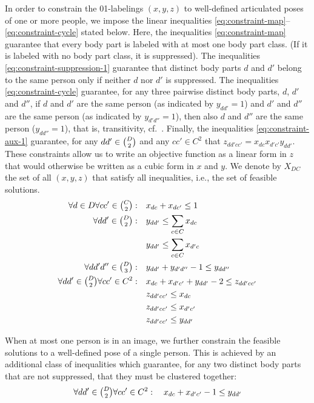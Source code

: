 In order to constrain the 01-labelings $(x,y,z)$ to well-defined articulated poses of one or more people,
we impose the linear inequalities
\eqref{eq:constraint-map}--\eqref{eq:constraint-cycle}
stated below.
%
%
Here, the inequalities
\eqref{eq:constraint-map}
guarantee that every body part is labeled with at most one body part class.
(If it is labeled with no body part class, it is suppressed).
%
The inequalities
\eqref{eq:constraint-suppression-1}
guarantee that distinct body parts $d$ and $d'$ belong to the same person only if neither $d$ nor $d'$ is suppressed.
%
The inequalities
\eqref{eq:constraint-cycle}
guarantee, for any three pairwise distinct body parts, $d$, $d'$ and $d''$, if $d$ and $d'$ are the same person (as indicated by $y_{dd'} = 1$) and $d'$ and $d''$ are the same person (as indicated by $y_{d'd''} = 1$), then also $d$ and $d''$ are the same person ($y_{dd''} = 1$),
that is, transitivity,
cf.~\cite{chopra-1993}.
%
Finally, the inequalities
\eqref{eq:constraint-aux-1}
guarantee, for any $dd' \in \tbinom{D}{2}$ and any $cc' \in C^2$ that $z_{dd'cc'} = x_{dc} x_{d'c'} y_{dd'}$.
These constraints allow us to write an objective function as a linear form in $z$ that would otherwise be written as a cubic form in $x$ and $y$.
%
We denote by $X_{DC}$ the set of all $(x,y,z)$ that satisfy all inequalities,
i.e., the set of feasible solutions.
%
\begin{align}
\forall d \in D \forall cc' \in \tbinom{C}{2}:
    & \quad x_{dc} + x_{dc'} \leq 1
    \label{eq:constraint-map}\\
\forall dd' \in \tbinom{D}{2}:
    & \quad y_{dd'} \leq \sum_{c \in C} x_{dc}
    \nonumber\\
    & \quad y_{dd'} \leq \sum_{c \in C} x_{d'c}
    \label{eq:constraint-suppression-1}\\
\forall dd'd'' \in \tbinom{D}{3}:
    & \quad y_{dd'} + y_{d'd''} - 1 \leq y_{dd''}
    \label{eq:constraint-cycle}\\
\forall dd' \in \tbinom{D}{2} \forall cc' \in C^2:
    & \quad x_{dc} + x_{d'c'} + y_{dd'} - 2 \leq z_{dd'cc'}
    \nonumber\\
    & \quad z_{dd'cc'} \leq x_{dc}
    \nonumber\\
    & \quad z_{dd'cc'} \leq x_{d'c'}
    \nonumber\\
    & \quad z_{dd'cc'} \leq y_{dd'}
    \label{eq:constraint-aux-1}
\end{align}

When at most one person is in an image,
we further constrain the feasible solutions to a well-defined pose of a single person.
This is achieved by an additional class of inequalities which guarantee, for any two distinct body parts that are not suppressed, that they must be clustered together:
%
\begin{align}
\forall dd' \in \tbinom{D}{2} \forall cc' \in C^2:
    \quad x_{dc} + x_{d'c'} - 1 \leq y_{dd'}
    \label{eq:constraint-single-person}
\end{align}




